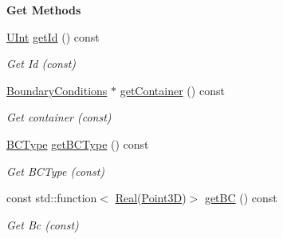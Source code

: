 \begin{Indent}{\bf Get Methods}\par
\begin{DoxyCompactItemize}
\item 
\hyperlink{namespaceFVCode3D_a4bf7e328c75d0fd504050d040ebe9eda}{U\+Int} \hyperlink{classFVCode3D_1_1BoundaryConditions_1_1BorderBC_adfb89622e564b4017e4cf4f804df6d8a}{get\+Id} () const 
\begin{DoxyCompactList}\small\item\em Get Id (const) \end{DoxyCompactList}\item 
\hyperlink{classFVCode3D_1_1BoundaryConditions}{Boundary\+Conditions} $\ast$ \hyperlink{classFVCode3D_1_1BoundaryConditions_1_1BorderBC_a77b7b9c3c63e556ab0eb5ad543ddac41}{get\+Container} () const 
\begin{DoxyCompactList}\small\item\em Get container (const) \end{DoxyCompactList}\item 
\hyperlink{namespaceFVCode3D_a73660061f11f1671164ce171a053f8c5}{B\+C\+Type} \hyperlink{classFVCode3D_1_1BoundaryConditions_1_1BorderBC_a1e9d7341245720930a5585caaa2e5d3c}{get\+B\+C\+Type} () const 
\begin{DoxyCompactList}\small\item\em Get B\+C\+Type (const) \end{DoxyCompactList}\item 
const std\+::function$<$ \hyperlink{namespaceFVCode3D_a40c1f5588a248569d80aa5f867080e83}{Real}(\hyperlink{classFVCode3D_1_1Point3D}{Point3D})$>$ \hyperlink{classFVCode3D_1_1BoundaryConditions_1_1BorderBC_af4849e14dd0292018422bfcd056ac867}{get\+BC} () const 
\begin{DoxyCompactList}\small\item\em Get Bc (const) \end{DoxyCompactList}\end{DoxyCompactItemize}
\end{Indent}

